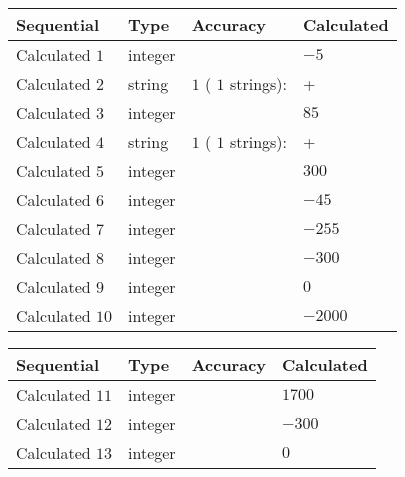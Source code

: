 \documentclass[12pt]{article}
\begin{document}
  
\noindent\begin{tabular}{|l|l|l|l|}
\hline
 Sequential & Type & Accuracy & Calculated \\ 
\hline
 
 
  Calculated $            1 $ & integer &  & 
  $ -5 $ 
 \\  \hline  
 
 
  Calculated $            2 $ & string & $            1  $ ( $           1  $ strings): 
 & +
 \\  \hline  
 
 
  Calculated $            3 $ & integer &  & 
  $ 85 $ 
 \\  \hline  
 
 
  Calculated $            4 $ & string & $            1  $ ( $           1  $ strings): 
 & +
 \\  \hline  
 
 
  Calculated $            5 $ & integer &  & 
  $ 300 $ 
 \\  \hline  
 
 
  Calculated $            6 $ & integer &  & 
  $ -45 $ 
 \\  \hline  
 
 
  Calculated $            7 $ & integer &  & 
  $ -255 $ 
 \\  \hline  
 
 
  Calculated $            8 $ & integer &  & 
  $ -300 $ 
 \\  \hline  
 
 
  Calculated $            9 $ & integer &  & 
  $ 0 $ 
 \\  \hline  
 
 
  Calculated $           10 $ & integer &  & 
  $ -2000 $ 
 \\  \hline  
 \end{tabular}
   
   
  
  
\noindent\begin{tabular}{|l|l|l|l|}
\hline
 Sequential & Type & Accuracy & Calculated \\ 
\hline
 
 
  Calculated $           11 $ & integer &  & 
  $ 1700 $ 
 \\  \hline  
 
 
  Calculated $           12 $ & integer &  & 
  $ -300 $ 
 \\  \hline  
 
 
  Calculated $           13 $ & integer &  & 
  $ 0 $ 
 \\  \hline  
 \end{tabular}
   
\end{document}
